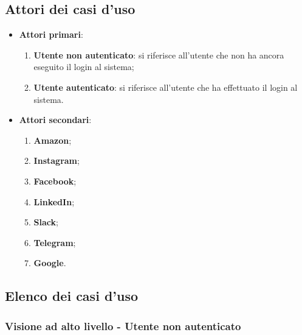 \subsection{Attori dei casi d'uso}
\begin{itemize}
    \item \textbf{Attori primari}: 
    
    \begin{enumerate}
    \item \textbf{Utente non autenticato}: si riferisce all'utente che non ha ancora eseguito il login al sistema;
     \item \textbf{Utente autenticato}: si riferisce all'utente che ha effettuato il login al sistema.
\end{enumerate}    
    
    \item \textbf{Attori secondari}:
    \begin{enumerate}
    \item \textbf{Amazon};
    \item \textbf{Instagram};
    \item \textbf{Facebook};
    \item \textbf{LinkedIn};
    \item \textbf{Slack};
    \item \textbf{Telegram};
    \item \textbf{Google}.
    \end{enumerate}
\end{itemize}
\pagebreak
\subsection{Elenco dei casi d'uso}


\subsubsection{Visione ad alto livello - Utente non autenticato}

